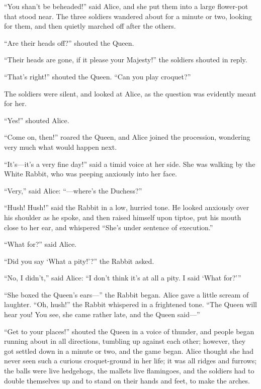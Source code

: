 \documentclass[11pt,openany,oneside]{book}
\begin{document}
“You shan’t be beheaded!” said Alice, and she put them into a large flower-pot that stood near. The three soldiers wandered about for a minute or two, looking for them, and then quietly marched off after the others. 

“Are their heads off?” shouted the Queen. 

“Their heads are gone, if it please your Majesty!” the soldiers shouted in reply. 

“That’s right!” shouted the Queen. “Can you play croquet?” 

The soldiers were silent, and looked at Alice, as the question was evidently meant for her. 

“Yes!” shouted Alice. 

“Come on, then!” roared the Queen, and Alice joined the procession, wondering very much what would happen next. 

“It’s—it’s a very fine day!” said a timid voice at her side. She was walking by the White Rabbit, who was peeping anxiously into her face. 

“Very,” said Alice: “—where’s the Duchess?” 

“Hush! Hush!” said the Rabbit in a low, hurried tone. He looked anxiously over his shoulder as he spoke, and then raised himself upon tiptoe, put his mouth close to her ear, and whispered “She’s under sentence of execution.” 

“What for?” said Alice. 

“Did you say ‘What a pity!’?” the Rabbit asked. 

“No, I didn’t,” said Alice: “I don’t think it’s at all a pity. I said ‘What for?’” 

“She boxed the Queen’s ears—” the Rabbit began. Alice gave a little scream of laughter. “Oh, hush!” the Rabbit whispered in a frightened tone. “The Queen will hear you! You see, she came rather late, and the Queen said—” 

“Get to your places!” shouted the Queen in a voice of thunder, and people began running about in all directions, tumbling up against each other; however, they got settled down in a minute or two, and the game began. Alice thought she had never seen such a curious croquet-ground in her life; it was all ridges and furrows; the balls were live hedgehogs, the mallets live flamingoes, and the soldiers had to double themselves up and to stand on their hands and feet, to make the arches. 
\end{document}
